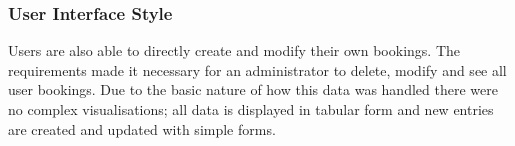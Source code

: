 \subsubsection{User Interface Style}
\par 
Users are also able to directly create and modify their own bookings. The requirements made it necessary for an administrator to delete, modify and see all user bookings. Due to the basic nature of how this data was handled there were no complex visualisations; all data is displayed in tabular form and new entries are created and updated with simple forms.
